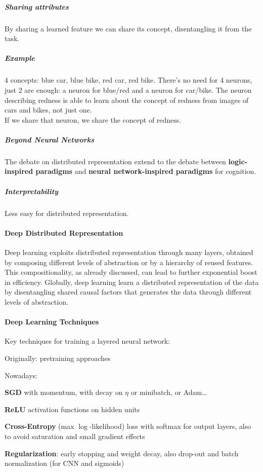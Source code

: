 \documentclass[10pt]{report}
\begin{document}
\subparagraph{Sharing attributes} By sharing a learned feature we can share its concept, disentangling it from the task.
\subparagraph{Example} 4 concepts: blue car, blue bike, red car, red bike. There's no need for 4 neurons, just 2 are enough: a neuron for blue/red and a neuron for car/bike. The neuron describing redness is able to learn about the concept of redness from images of cars and bikes, not just one.\\
If we share that neuron, we share the concept of redness.
\subparagraph{Beyond Neural Networks} The debate on distributed representation extend to the debate between \textbf{logic-inspired paradigms} and \textbf{neural network-inspired paradigms} for cognition.
\subparagraph{Interpretability} Less easy for distributed representation.
\paragraph{Deep Distributed Representation} Deep learning exploits distributed representation through many layers, obtained by composing different levels of abstraction or by a hierarchy of reused features. This compositionality, as already discussed, can lead to further exponential boost in efficiency. Globally, deep learning learn a distributed representation of the data by disentangling shared causal factors that generates the data through different levels of abstraction.
\paragraph{Deep Learning Techniques} Key techniques for training a layered neural network:
\begin{list}{}{}
	\item Originally: pretraining approaches
	\item Nowadays:
	\begin{list}{}{}
		\item \textbf{SGD} with momentum, with decay on $\eta$ or minibatch, or Adam\ldots
		\item \textbf{ReLU} activation functions on hidden units
		\item \textbf{Cross-Entropy} (max $\log$-likelihood) loss with softmax for output layers, also to avoid saturation and small gradient effects
		\item \textbf{Regularization}: early stopping and weight decay, also drop-out and batch normalization (for CNN and sigmoids)
	\end{list}
\end{list} 
\end{document}

